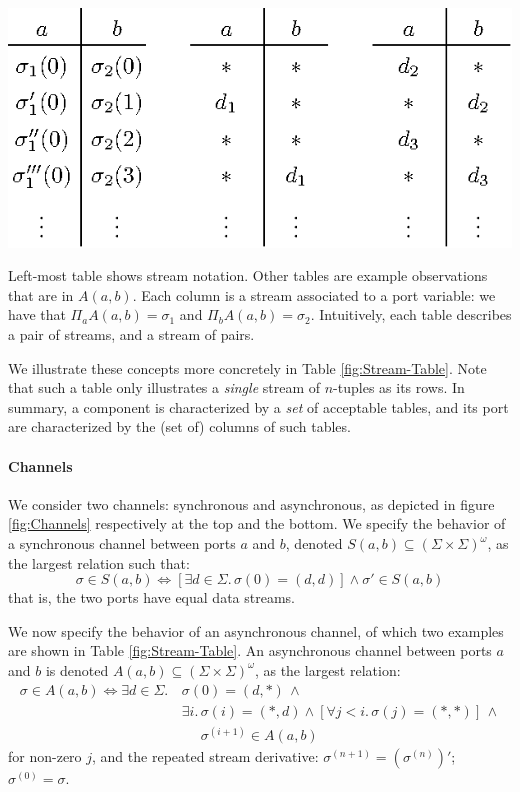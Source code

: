 \begin{table}[b]
	\begin{center}
		\includegraphics[scale=0.8]{pic/stream-table}
	\end{center}
	\caption{
		\label{fig:Stream-Table}Left-most table shows stream notation. Other tables are example observations that are in $A(a,b)$.  Each column is a stream associated to a port variable: we have that $\Pi_a A(a,b)=\sigma_1$ and $\Pi_b A(a,b)=\sigma_2$. Intuitively, each table describes a pair of streams, and a stream of pairs.}
\end{table}

We illustrate these concepts more concretely in Table \ref{fig:Stream-Table}.
Note that such a table only illustrates a \emph{single} stream of $n$-tuples as its rows.
In summary, a component is characterized by a \emph{set} of acceptable tables,
and its port are characterized by the (set of) columns of such tables.

\vspace{-5pt}

\paragraph{Channels} We consider two channels: synchronous and asynchronous,
as depicted in figure \ref{fig:Channels} respectively at the top and the bottom.
We specify the behavior of a synchronous channel between ports $a$ and $b$, denoted $S(a,b)\subseteq(\Sigma\times\Sigma)^{\omega}$, as the largest relation such that:
$$\sigma\in S(a,b)\Leftrightarrow\left[\exists d\in \Sigma.\,\sigma(0)=(d,d)\right]\land\sigma'\in S(a,b)$$
that is, the two ports have equal data streams.

We now specify the behavior of an asynchronous channel, of which two examples are shown
in Table \ref{fig:Stream-Table}. An asynchronous channel between ports $a$ and $b$ is denoted $A(a,b)\subseteq(\Sigma\times\Sigma)^{\omega}$,
as the largest relation:
\begin{align*}
	\sigma\in A(a,b)\Leftrightarrow\exists d\in \Sigma.\, & \sigma(0)=(d,*)\,\land\\
	& \exists i.\,\sigma(i)=(*,d)\land\left[\forall j<i.\,\sigma(j)=(*,*)\right]\,\land\\
	& \phantom{\exists i.\,}\sigma^{(i+1)}\in A(a,b)
\end{align*}
for non-zero $j$, and the repeated stream derivative: $\sigma^{(n+1)}=\left(\sigma^{(n)}\right)'$; $\sigma^{(0)}=\sigma$.

